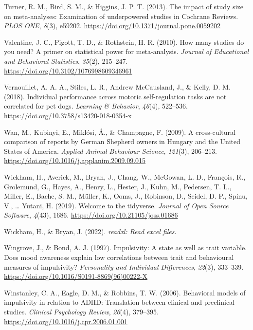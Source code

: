 \documentclass[
  ,pub,floatsintext]{apa6}
\newlength{\cslhangindent}
\newlength{\cslentryspacingunit} %
\newenvironment{CSLReferences}[2] %
 {%
  \setlength{\parindent}{0pt}
  \ifodd #1
  \let\oldpar\par
  \def\par{\hangindent=\cslhangindent\oldpar}
  \fi
  \setlength{\parskip}{#2\cslentryspacingunit}
 }%
 {}
\begin{document}
\begin{CSLReferences}{1}{0}
\leavevmode{}%
Turner, R. M., Bird, S. M., \& Higgins, J. P. T. (2013). The impact of study size on meta-analyses: {Examination} of underpowered studies in {Cochrane Reviews}. \emph{PLOS ONE}, \emph{8}(3), e59202. \url{https://doi.org/10.1371/journal.pone.0059202}

\leavevmode{}%
Valentine, J. C., Pigott, T. D., \& Rothstein, H. R. (2010). How many studies do you need? {A} primer on statistical power for meta-analysis. \emph{Journal of Educational and Behavioral Statistics}, \emph{35}(2), 215--247. \url{https://doi.org/10.3102/1076998609346961}

\leavevmode{}%
Vernouillet, A. A. A., Stiles, L. R., Andrew McCausland, J., \& Kelly, D. M. (2018). Individual performance across motoric self-regulation tasks are not correlated for pet dogs. \emph{Learning \& Behavior}, \emph{46}(4), 522--536. \url{https://doi.org/10.3758/s13420-018-0354-x}

\leavevmode{}%
Wan, M., Kubinyi, E., Miklósi, Á., \& Champagne, F. (2009). A cross-cultural comparison of reports by {German Shepherd} owners in {Hungary} and the {United States} of {America}. \emph{Applied Animal Behaviour Science}, \emph{121}(3), 206--213. \url{https://doi.org/10.1016/j.applanim.2009.09.015}

\leavevmode{}%
Wickham, H., Averick, M., Bryan, J., Chang, W., McGowan, L. D., François, R., Grolemund, G., Hayes, A., Henry, L., Hester, J., Kuhn, M., Pedersen, T. L., Miller, E., Bache, S. M., Müller, K., Ooms, J., Robinson, D., Seidel, D. P., Spinu, V., \ldots{} Yutani, H. (2019). Welcome to the {tidyverse}. \emph{Journal of Open Source Software}, \emph{4}(43), 1686. \url{https://doi.org/10.21105/joss.01686}

\leavevmode{}%
Wickham, H., \& Bryan, J. (2022). \emph{{readxl}: Read excel files}.

\leavevmode{}%
Wingrove, J., \& Bond, A. J. (1997). Impulsivity: {A} state as well as trait variable. {Does} mood awareness explain low correlations between trait and behavioural measures of impulsivity? \emph{Personality and Individual Differences}, \emph{22}(3), 333--339. \url{https://doi.org/10.1016/S0191-8869(96)00222-X}

\leavevmode{}%
Winstanley, C. A., Eagle, D. M., \& Robbins, T. W. (2006). Behavioral models of impulsivity in relation to {ADHD}: Translation between clinical and preclinical studies. \emph{Clinical Psychology Review}, \emph{26}(4), 379--395. \url{https://doi.org/10.1016/j.cpr.2006.01.001}


\end{CSLReferences}
\end{document}
